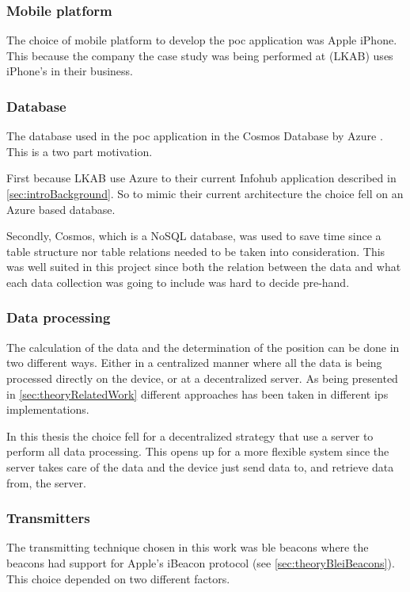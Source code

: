 \subsubsection{Mobile platform}\label{sec:methodSoftwareDesignMobilePlatform}
The choice of mobile platform to develop the \acrlong{poc} application was Apple iPhone.
This because the company the case study was being performed at (LKAB) uses iPhone's in their business.


\subsubsection{Database}\label{sec:methodSoftwareDesignDatabase}
The database used in the \acrshort{poc} application in the Cosmos Database by Azure \cite{IntroductionAzureCosmos}.
This is a two part motivation.

\bigskip

First because LKAB use Azure to their current Infohub application described in \cref{sec:introBackground}.
So to mimic their current architecture the choice fell on an Azure based database.

\bigskip

Secondly, Cosmos, which is a NoSQL database, was used to save time since a table structure nor table relations needed to be taken into consideration.
This was well suited in this project since both the relation between the data and what each data collection was going to include was hard to decide pre-hand.


\subsubsection{Data processing}\label{sec:methodSoftwareDesignData}
The calculation of the data and the determination of the position can be done in two different ways.
Either in a centralized manner where all the data is being processed directly on the device, or at a decentralized server.
As being presented in \cref{sec:theoryRelatedWork} different approaches has been taken in different \acrshort{ips} implementations.

\bigskip

In this thesis the choice fell for a decentralized strategy that use a server to perform all data processing.
This opens up for a more flexible system since the server takes care of the data and the device just send data to, and retrieve data from, the server.


\subsubsection{Transmitters}\label{sec:methodSoftwareDesignTransmitters}
The transmitting technique chosen in this work was \acrshort{ble} beacons where the beacons had support for Apple's iBeacon protocol (see \cref{sec:theoryBleiBeacons}).
This choice depended on two different factors.

